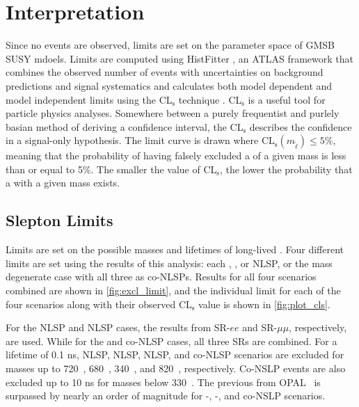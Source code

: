 \FloatBarrier
\section{Interpretation}

Since no events are observed, limits are set on the parameter space of \ac{GMSB} \ac{SUSY} mdoels. Limits are computed using HistFitter \cite{histfitter}, an \ac{ATLAS} framework that combines the observed number of events with uncertainties on background predictions and signal systematics and calculates both model dependent and model independent limits using the CL$_{\text{s}}$ technique \cite{CLs-1}. CL$_{\text{s}}$ is a useful tool for particle physics analyses. Somewhere between a purely frequentist and purlely basian method of deriving a confidence interval, the CL$_{\text{s}}$ describes the confidence in a signal-only hypothesis. The limit curve is drawn where CL$_{\text{s}}(m_{\tilde{\ell}}) \leq 5\%$, meaning that the probability of having falsely excluded a \slep of a given mass is less than or equal to 5\%. The smaller the value of CL$_{\text{s}}$, the lower the probability that a \slep with a given mass exists.  

\subsection{Slepton Limits}
Limits are set on the possible masses and lifetimes of long-lived \slep. Four different limits are set using the results of this analysis: each \selec, \smu, or \stau \ac{NLSP}, or the mass degenerate case with all three as co-\ac{NLSP}s. Results for all four scenarios combined are shown in \autoref{fig:excl_limit}, and the individual limit for each of the four scenarios along with their observed CL$_{\text{s}}$ value is shown in \autoref{fig:plot_cls}.

For the \selec \ac{NLSP} and \smu \ac{NLSP} cases, the results from SR-$ee$ and SR-$\mu\mu$, respectively, are used. While for the \stau and co-\ac{NLSP} cases, all three SRs are combined. For a lifetime of 0.1 ns, \selec NLSP, \smu \ac{NLSP}, \stau \ac{NLSP}, and co-NLSP scenarios are excluded for \slep masses up to 720~\GeV, 680~\GeV, 340~\GeV, and 820~\GeV, respectively. Co-NSLP events are also excluded up to 10 ns for masses below 330~\GeV. The previous from OPAL~\cite{opal} is surpassed by nearly an order of magnitude for \selec-, \smu-, and co-NSLP scenarios.


